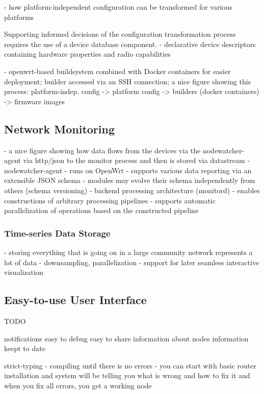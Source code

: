 \documentclass[5p,sort&compress]{elsarticle}
\begin{document}
- how platform-independent configuration can be transformed for various platforms

Supporting informed decisions of the configuration transformation process requires the use of a device database component.
  - declarative device descriptors containing hardware properties and radio capabilities

- openwrt-based buildsystem combined with Docker containers for easier deployment; builder accessed via an SSH connection; a nice figure showing this process: platform-indep. config -> platform config -> builders (docker containers) -> firmware images

\subsection{Network Monitoring}

- a nice figure showing how data flows from the devices via the nodewatcher-agent via http/json to the monitor process and then is stored via datastream
- nodewatcher-agent
  - runs on OpenWrt
  - supports various data reporting via an extensible JSON schema
  - modules may evolve their schema independently from others (schema versioning)
- backend processing architecture (monitord)
  - enables constructions of arbitrary processing pipelines
  - supports automatic parallelization of operations based on the constructed pipeline

\subsubsection{Time-series Data Storage}

- storing everything that is going on in a large community network represents a lot of data
- downsampling, parallelization
- support for later seamless interactive visualization

\subsection{Easy-to-use User Interface}

TODO

notifications
easy to debug
easy to share information about nodes
information keept to date

strict-typing - compiling until there is no errors - you can start with basic router installation and system will be telling you what is wrong and how to fix it and when you fix all errors, you get a working node
\end{document}
